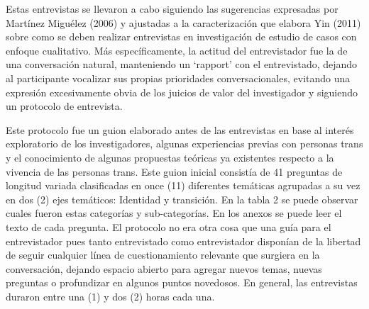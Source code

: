 Estas entrevistas se llevaron a cabo siguiendo las sugerencias expresadas por
Martínez Miguélez (2006) y ajustadas a la caracterización que elabora Yin (2011)
sobre como se deben realizar entrevistas en investigación de estudio de casos
con enfoque cualitativo.
Más específicamente, la actitud del entrevistador fue la de una conversación
natural, manteniendo un ‘rapport’ con el entrevistado, dejando al participante
vocalizar sus propias prioridades conversacionales, evitando una expresión
excesivamente obvia de los juicios de valor del investigador y siguiendo un
protocolo de entrevista.

Este protocolo fue un guion elaborado antes de las entrevistas en base al
interés exploratorio de los investigadores, algunas experiencias previas con
personas trans y el conocimiento de algunas propuestas teóricas ya existentes
respecto a la vivencia de las personas trans.
Este guion inicial consistía de 41 preguntas de longitud variada clasificadas en
once (11) diferentes temáticas agrupadas a su vez en dos (2) ejes temáticos:
Identidad y transición.
En la tabla 2 se puede observar cuales fueron estas categorías y sub-categorías.
En los anexos se puede leer el texto de cada pregunta.
El protocolo no era otra cosa que una guía para el entrevistador pues tanto
entrevistado como entrevistador disponían de la libertad de seguir cualquier
línea de cuestionamiento relevante que surgiera en la conversación, dejando
espacio abierto para agregar nuevos temas, nuevas preguntas o profundizar en
algunos puntos novedosos.
En general, las entrevistas duraron entre una (1) y dos (2) horas cada una.

